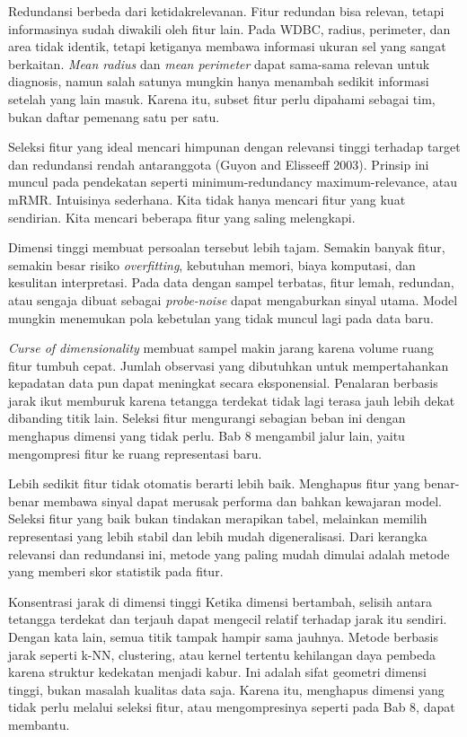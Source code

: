 Redundansi berbeda dari ketidakrelevanan. Fitur redundan bisa relevan, tetapi informasinya sudah diwakili oleh fitur lain. Pada WDBC, radius, perimeter, dan area tidak identik, tetapi ketiganya membawa informasi ukuran sel yang sangat berkaitan. \emph{Mean radius} dan \emph{mean perimeter} dapat sama-sama relevan untuk diagnosis, namun salah satunya mungkin hanya menambah sedikit informasi setelah yang lain masuk. Karena itu, subset fitur perlu dipahami sebagai tim, bukan daftar pemenang satu per satu.

Seleksi fitur yang ideal mencari himpunan dengan relevansi tinggi terhadap target dan redundansi rendah antaranggota (Guyon and Elisseeff 2003). Prinsip ini muncul pada pendekatan seperti minimum-redundancy maximum-relevance, atau mRMR. Intuisinya sederhana. Kita tidak hanya mencari fitur yang kuat sendirian. Kita mencari beberapa fitur yang saling melengkapi.

Dimensi tinggi membuat persoalan tersebut lebih tajam. Semakin banyak fitur, semakin besar risiko \emph{overfitting}, kebutuhan memori, biaya komputasi, dan kesulitan interpretasi. Pada data dengan sampel terbatas, fitur lemah, redundan, atau sengaja dibuat sebagai \emph{probe-noise} dapat mengaburkan sinyal utama. Model mungkin menemukan pola kebetulan yang tidak muncul lagi pada data baru.

\emph{Curse of dimensionality} membuat sampel makin jarang karena volume ruang fitur tumbuh cepat. Jumlah observasi yang dibutuhkan untuk mempertahankan kepadatan data pun dapat meningkat secara eksponensial. Penalaran berbasis jarak ikut memburuk karena tetangga terdekat tidak lagi terasa jauh lebih dekat dibanding titik lain. Seleksi fitur mengurangi sebagian beban ini dengan menghapus dimensi yang tidak perlu. Bab 8 mengambil jalur lain, yaitu mengompresi fitur ke ruang representasi baru.

Lebih sedikit fitur tidak otomatis berarti lebih baik. Menghapus fitur yang benar-benar membawa sinyal dapat merusak performa dan bahkan kewajaran model. Seleksi fitur yang baik bukan tindakan merapikan tabel, melainkan memilih representasi yang lebih stabil dan lebih mudah digeneralisasi. Dari kerangka relevansi dan redundansi ini, metode yang paling mudah dimulai adalah metode yang memberi skor statistik pada fitur.

\begin{pendalaman}{Konsentrasi jarak di dimensi tinggi}
Ketika dimensi bertambah, selisih antara tetangga terdekat dan terjauh dapat mengecil relatif terhadap jarak itu sendiri. Dengan kata lain, semua titik tampak hampir sama jauhnya. Metode berbasis jarak seperti k-NN, clustering, atau kernel tertentu kehilangan daya pembeda karena struktur kedekatan menjadi kabur. Ini adalah sifat geometri dimensi tinggi, bukan masalah kualitas data saja. Karena itu, menghapus dimensi yang tidak perlu melalui seleksi fitur, atau mengompresinya seperti pada Bab 8, dapat membantu.
\end{pendalaman}

